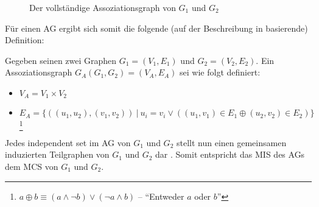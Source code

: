 
\begin{figure}[htb]
\centering
{}
\caption{Der vollständige Assoziationsgraph von $G_1$ und $G_2$}
\label{pic:bsg_ag_edges}
\end{figure}

Für einen AG ergibt sich somit die folgende (auf der Beschreibung in 
\cite{MaxCSwitMaxIS} basierende) Definition:

\begin{mydef}[Assoziationsgraph]\label{def:Assoziationsgraph}
Gegeben seinen zwei Graphen $G_1=(V_1,E_1)$ und $G_2=(V_2,E_2)$. Ein 
Assoziationsgraph $G_A(G_1,G_2)=(V_A,E_A)$ sei wie folgt definiert:
\begin{itemize}
	\item $V_A= V_1 \times V_2$
	\item $E_A=\{((u_1,u_2),(v_1,v_2))\ |\ u_i=v_i \vee 
	       ((u_1,v_1) \in E_1 \oplus  (u_2,v_2) \in E_2)\}$\footnote{$a \oplus b \equiv
	       (a \wedge \neg b) \vee (\neg a \wedge b)$ -- "`Entweder $a$ oder $b$"'}
\end{itemize}
\end{mydef}

Jedes independent set im AG von $G_1$ und $G_2$ stellt nun einen gemeinsamen 
induzierten Teilgraphen von $G_1$ und $G_2$ dar \cite{MaxCSwitMaxIS}. Somit 
entspricht das MIS des AGs dem MCS von $G_1$ und $G_2$.
